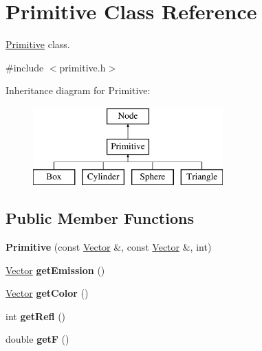\hypertarget{class_primitive}{
\section{\-Primitive \-Class \-Reference}
\label{class_primitive}
}


\hyperlink{class_primitive}{\-Primitive} class.  




{\ttfamily \#include $<$primitive.\-h$>$}

\-Inheritance diagram for \-Primitive\-:\begin{figure}[H]
\begin{center}
\leavevmode
\includegraphics[height=3.000000cm]{class_primitive}
\end{center}
\end{figure}
\subsection*{\-Public \-Member \-Functions}
\begin{DoxyCompactItemize}
\item 
\hypertarget{class_primitive_a91a5e120794dfe52e920c75a1bff0008}{
{\bfseries \-Primitive} (const \hyperlink{class_vector}{\-Vector} \&, const \hyperlink{class_vector}{\-Vector} \&, int)}
\label{class_primitive_a91a5e120794dfe52e920c75a1bff0008}

\item 
\hypertarget{class_primitive_a1a0a0c026a30397c23944b4270fdfbc0}{
\hyperlink{class_vector}{\-Vector} {\bfseries get\-Emission} ()}
\label{class_primitive_a1a0a0c026a30397c23944b4270fdfbc0}

\item 
\hypertarget{class_primitive_ae092397067c2197f62f70ab930146f3a}{
\hyperlink{class_vector}{\-Vector} {\bfseries get\-Color} ()}
\label{class_primitive_ae092397067c2197f62f70ab930146f3a}

\item 
\hypertarget{class_primitive_acc17c8f82c1e434be04c1d13aaccb69c}{
int {\bfseries get\-Refl} ()}
\label{class_primitive_acc17c8f82c1e434be04c1d13aaccb69c}

\item 
\hypertarget{class_primitive_ab0f0642b9a163d32462be8e8edcb30ff}{
double {\bfseries get\-F} ()}
\label{class_primitive_ab0f0642b9a163d32462be8e8edcb30ff}

\end{DoxyCompactItemize}
